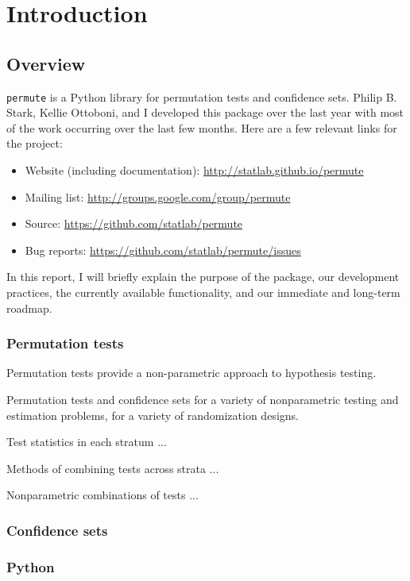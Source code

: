 \chapter{Introduction}

\section{Overview}

\texttt{permute} is a Python library for permutation tests and confidence sets.
Philip B. Stark, Kellie Ottoboni, and I developed this package over the
last year with most of the work occurring over the last few months.
Here are a few relevant links for the project:
\begin{itemize}
\item Website (including documentation): \url{http://statlab.github.io/permute}
\item Mailing list: \url{http://groups.google.com/group/permute}
\item Source: \url{https://github.com/statlab/permute}
\item Bug reports: \url{https://github.com/statlab/permute/issues}
\end{itemize}
In this report, I will briefly explain the purpose of the package, our
development practices, the currently available functionality, and
our immediate and long-term roadmap.

\subsection{Permutation tests}

Permutation tests provide a non-parametric approach to hypothesis testing.

Permutation tests and confidence sets for a variety of nonparametric testing
and estimation problems, for a variety of randomization designs.
   
Test statistics in each stratum ...

Methods of combining tests across strata ...

Nonparametric combinations of tests ...

\subsection{Confidence sets}

\subsection{Python}

